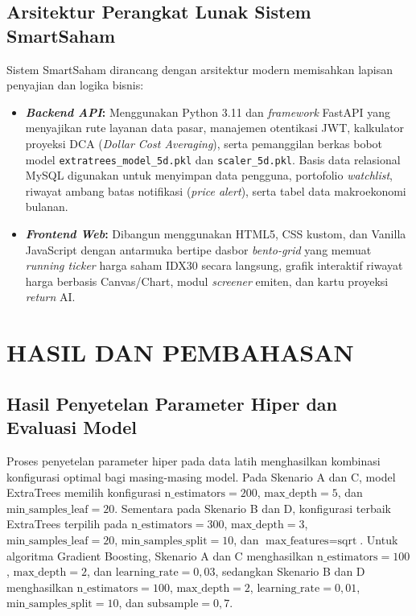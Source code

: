 \documentclass[10pt,a4paper]{article}
\begin{document}
\subsection{Arsitektur Perangkat Lunak Sistem SmartSaham}
Sistem SmartSaham dirancang dengan arsitektur modern memisahkan lapisan penyajian dan logika bisnis:
\begin{itemize}
  \item \textbf{\textit{Backend API}:} Menggunakan Python 3.11 dan \textit{framework} FastAPI yang menyajikan rute layanan data pasar, manajemen otentikasi JWT, kalkulator proyeksi DCA (\textit{Dollar Cost Averaging}), serta pemanggilan berkas bobot model \texttt{extratrees\_model\_5d.pkl} dan \texttt{scaler\_5d.pkl}. Basis data relasional MySQL digunakan untuk menyimpan data pengguna, portofolio \textit{watchlist}, riwayat ambang batas notifikasi (\textit{price alert}), serta tabel data makroekonomi bulanan.
  \item \textbf{\textit{Frontend Web}:} Dibangun menggunakan HTML5, CSS kustom, dan Vanilla JavaScript dengan antarmuka bertipe dasbor \textit{bento-grid} yang memuat \textit{running ticker} harga saham IDX30 secara langsung, grafik interaktif riwayat harga berbasis Canvas/Chart, modul \textit{screener} emiten, dan kartu proyeksi \textit{return} AI.
\end{itemize}

\section{HASIL DAN PEMBAHASAN}

\subsection{Hasil Penyetelan Parameter Hiper dan Evaluasi Model}
Proses penyetelan parameter hiper pada data latih menghasilkan kombinasi konfigurasi optimal bagi masing-masing model. Pada Skenario A dan C, model ExtraTrees memilih konfigurasi $\text{n\_estimators}=200$, $\text{max\_depth}=5$, dan $\text{min\_samples\_leaf}=20$. Sementara pada Skenario B dan D, konfigurasi terbaik ExtraTrees terpilih pada $\text{n\_estimators}=300$, $\text{max\_depth}=3$, $\text{min\_samples\_leaf}=20$, $\text{min\_samples\_split}=10$, dan $\text{max\_features}=\text{sqrt}$. Untuk algoritma Gradient Boosting, Skenario A dan C menghasilkan $\text{n\_estimators}=100$, $\text{max\_depth}=2$, dan $\text{learning\_rate}=0,03$, sedangkan Skenario B dan D menghasilkan $\text{n\_estimators}=100$, $\text{max\_depth}=2$, $\text{learning\_rate}=0,01$, $\text{min\_samples\_split}=10$, dan $\text{subsample}=0,7$.
\end{document}
